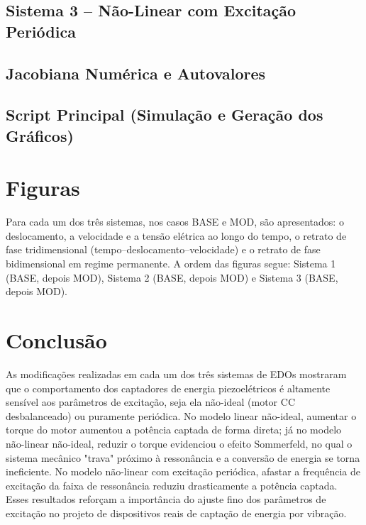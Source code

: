 \documentclass[a4paper,11pt]{article}
\begin{document}
\subsection{Sistema 3 -- Não-Linear com Excitação Periódica}



\subsection{Jacobiana Numérica e Autovalores}



\subsection{Script Principal (Simulação e Geração dos Gráficos)}


\section{Figuras}
\label{sec:figuras2}

Para cada um dos três sistemas, nos casos BASE e MOD, são apresentados:
o deslocamento, a velocidade e a tensão elétrica ao longo do tempo, o
retrato de fase tridimensional (tempo--deslocamento--velocidade) e o
retrato de fase bidimensional em regime permanente. A ordem das figuras
segue: Sistema 1 (BASE, depois MOD), Sistema 2 (BASE, depois MOD) e
Sistema 3 (BASE, depois MOD).



\section{Conclusão}

As modificações realizadas em cada um dos três sistemas de EDOs
mostraram que o comportamento dos captadores de energia piezoelétricos
é altamente sensível aos parâmetros de excitação, seja ela não-ideal
(motor CC desbalanceado) ou puramente periódica. No modelo linear
não-ideal, aumentar o torque do motor aumentou a potência captada de
forma direta; já no modelo não-linear não-ideal, reduzir o torque
evidenciou o efeito Sommerfeld, no qual o sistema mecânico "trava"
próximo à ressonância e a conversão de energia se torna ineficiente.
No modelo não-linear com excitação periódica, afastar a frequência de
excitação da faixa de ressonância reduziu drasticamente a potência
captada. Esses resultados reforçam a importância do ajuste fino dos
parâmetros de excitação no projeto de dispositivos reais de captação de
energia por vibração.
\end{document}
